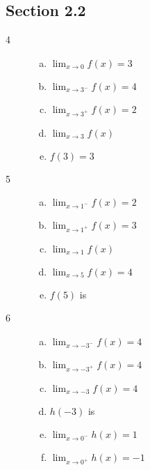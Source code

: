 \documentclass[letterpaper, landscape]{exam}
\begin{document}
    \subsection{Section 2.2}
    \begin{description}

      \item[4]
        \begin{enumerate}[(a)]
          \item $\lim_{x \to 0} f(x) = \boxed{ 3 }$
          \item $\lim_{x \to 3^-} f(x) = \boxed{ 4 }$
          \item $\lim_{x \to 3^+} f(x) = \boxed{ 2 }$
          \item $\lim_{x \to 3} f(x)$  
          \item $f(3) = \boxed{ 3 }$
        \end{enumerate}

      \newpage 

      \item[5]
        \begin{enumerate}[(a)]
          \item $\lim_{x \to 1^-} f(x) = \boxed{ 2 }$
          \item $\lim_{x \to 1^+} f(x) = \boxed{ 3 }$
          \item $\lim_{x \to 1} f(x)$ 
          \item $\lim_{x \to 5} f(x) = \boxed{ 4 }$
          \item $f(5)$ is 
        \end{enumerate}

      \item[6]
        \begin{enumerate}[(a)]
          \item $\lim_{x \to -3^-} f(x) = \boxed{ 4 }$

          \item $\lim_{x \to -3^+} f(x) = \boxed{ 4 }$

          \item $\lim_{x \to -3} f(x) = \boxed{ 4 }$

          \item $h(-3)$ is 

          \item $\lim_{x \to 0^-} h(x) = \boxed{ 1 }$

          \item $\lim_{x \to 0^+} h(x) = \boxed{ -1 }$


\end{enumerate}
\end{description}
\end{document}

